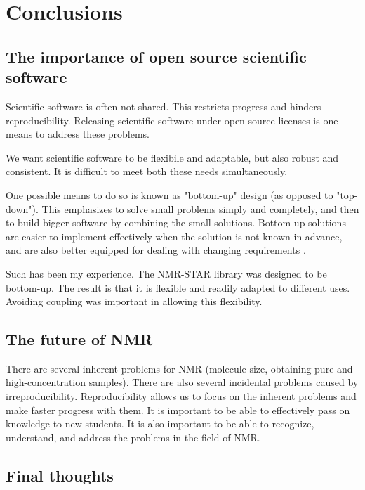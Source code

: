 \chapter{Conclusions}

\section{The importance of open source scientific software}

Scientific software is often not shared.
This restricts progress and hinders reproducibility.
Releasing scientific software under open source licenses is one means to
address these problems. 

We want scientific software to be flexibile and adaptable, but also robust and consistent.
It is difficult to meet both these needs simultaneously.

One possible means to do so is known as "bottom-up" \cite{bottomup1994, bottomup2004} design
(as opposed to "top-down").  This emphasizes to solve small problems simply and 
completely, and then to build bigger software by combining the small solutions.  
Bottom-up solutions are easier to implement effectively when the solution is not known in advance, and are also better
equipped for dealing with changing requirements \cite{topdown_bottomup, bottomup1994, bottomup2004}.  

Such has been my experience.  The NMR-STAR library was designed to be bottom-up.
The result is that it is flexible and readily adapted to different uses.
Avoiding coupling \cite{coupling1992} was important in allowing this flexibility.


\section{The future of NMR}
There are several inherent problems for NMR (molecule size, obtaining pure and high-concentration samples).
There are also several incidental problems caused by irreproducibility.
Reproducibility allows us to focus on the inherent problems and make faster progress with them.
It is important to be able to effectively pass on knowledge to new students.
It is also important to be able to recognize, understand, and address the problems in the field of NMR.


\section{Final thoughts}



